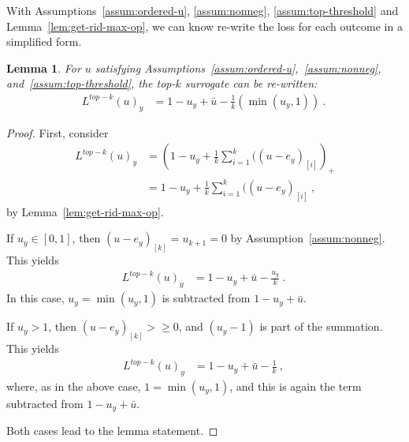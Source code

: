 \documentclass[12pt]{article}
\newcommand{\Comments}{1}
\newcommand{\mynote}[2]{\ifnum\Comments=1\textcolor{#1}{#2}\fi}
\newcommand{\jessie}[1]{\mynote{purple}{[JF: #1]}}
\newcommand{\ubar}{\bar{u}}
\newtheorem{lemma}{Lemma}
\begin{document}
With Assumptions~\ref{assum:ordered-u}, \ref{assum:nonneg}, \ref{assum:top-threshold} and Lemma~\ref{lem:get-rid-max-op}, we can know re-write the loss for each outcome in a simplified form.
\begin{lemma}\label{lem:new-form-surrogate}
	For $u$ satisfying Assumptions~\ref{assum:ordered-u},~\ref{assum:nonneg}, and~\ref{assum:top-threshold}, the top-$k$ surrogate can be re-written:
\begin{align*} 
L^{top-k}(u)_y  &= 1 - u_y + \bar u - \frac{1}{k}(\min(u_y, 1))~.~
\end{align*}
\end{lemma}
\begin{proof}
	First, consider
\begin{align*}
	L^{top-k}(u)_y &= \left(1 -u_y + \frac{1}{k} \sum_{i=1}^k ((u - e_y)_{[i]} \right)_+\\
	&= 1 -u_y + \frac{1}{k} \sum_{i=1}^k ((u - e_y)_{[i]}~,
	\end{align*}
	by Lemma~\ref{lem:get-rid-max-op}.

	
	If $u_y \in [0,1]$, then $(u-e_y)_{[k]} = u_{k+1} = 0$ by Assumption~\ref{assum:nonneg}.
	This yields
	\begin{align*}
	L^{top-k}(u)_y &= 1 - u_y + \bar u - \frac{u_y}{k}~.~
	\end{align*}
	In this case, $u_y = \min(u_y, 1)$ is subtracted from $1 - u_y + \bar u$.

	If $u_y > 1$, then $(u-e_y)_{[k]} >\geq 0$, and $(u_y - 1)$ is part of the summation.
	This yields
	\begin{align*}
	L^{top-k}(u)_y &= 1 - u_y + \bar u - \frac{1}{k}~,~
	\end{align*}
	where, as in the above case, $1 = \min(u_y, 1)$, and this is again the term subtracted from $1 - u_y + \bar u$.
	
	Both cases lead to the lemma statement.
\end{proof}


%
%
\end{document}
